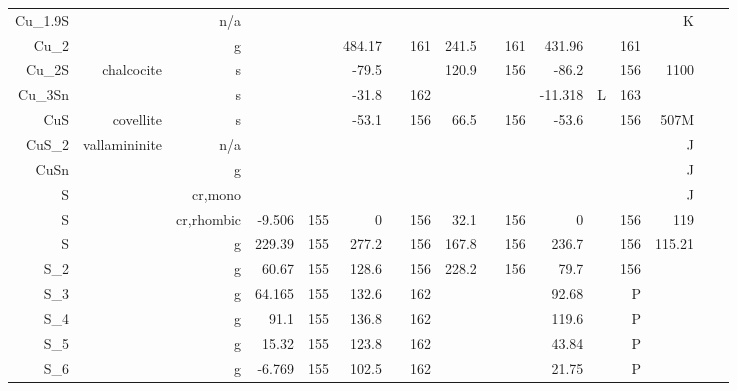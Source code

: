 \begin{table}[htbp]
\begin{adjustbox}{width=1\textwidth}
\begin{tabular}{rrrrrrrrrrrrrrrrr}
    Cu\_1.9S &       & n/a   &       &       &       &       &       &       &       &       &       &       &       & K     &       &  \\
    Cu\_2 &       & g     &       &       & 484.17 &       & 161   & 241.5 &       & 161   & 431.96 &       & 161   &       &       &  \\
    Cu\_2S & chalcocite & s     &       &       & -79.5 &       &       & 120.9 &       & 156   & -86.2 &       & 156   & 1100  &       &  \\
    Cu\_3Sn &       & s     &       &       & -31.8 &       & 162   &       &       &       & -11.318 & L     & 163   &       &       &  \\
    CuS   & covellite & s     &       &       & -53.1 &       & 156   & 66.5  &       & 156   & -53.6 &       & 156   & 507M  &       &  \\
    CuS\_2 & vallamininite & n/a   &       &       &       &       &       &       &       &       &       &       &       & J     &       &  \\
    CuSn  &       & g     &       &       &       &       &       &       &       &       &       &       &       & J     &       &  \\
    S     &       & cr,mono &       &       &       &       &       &       &       &       &       &       &       & J     &       &  \\
    S     &       & cr,rhombic & -9.506 & 155   & 0     &       & 156   & 32.1  &       & 156   & 0     &       & 156   & 119   &       &  \\
    S     &       & g     & 229.39 & 155   & 277.2 &       & 156   & 167.8 &       & 156   & 236.7 &       & 156   & 115.21 &       &  \\
    S\_2  &       & g     & 60.67 & 155   & 128.6 &       & 156   & 228.2 &       & 156   & 79.7  &       & 156   &       &       &  \\
    S\_3  &       & g     & 64.165 & 155   & 132.6 &       & 162   &       &       &       & 92.68 &       & P     &       &       &  \\
    S\_4  &       & g     & 91.1  & 155   & 136.8 &       & 162   &       &       &       & 119.6 &       & P     &       &       &  \\
    S\_5  &       & g     & 15.32 & 155   & 123.8 &       & 162   &       &       &       & 43.84 &       & P     &       &       &  \\
    S\_6  &       & g     & -6.769 & 155   & 102.5 &       & 162   &       &       &       & 21.75 &       & P     &       &       &  \\

\end{tabular}
\end{adjustbox}
\end{table}
